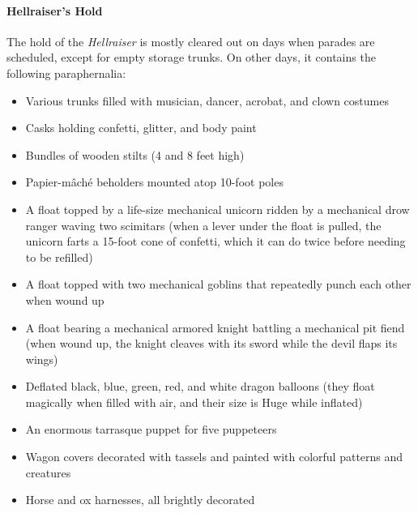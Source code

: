 \documentclass[10pt,a4paper,twoside,twocolumn,openany,nodeprecatedcode]{dndbook}
\begin{document}
\paragraph{Hellraiser's Hold}
The hold of the \textit{Hellraiser} is mostly cleared out on days when parades are scheduled, except for empty storage trunks. On other days, it contains the following paraphernalia:
\begin{itemize}

\item Various trunks filled with musician, dancer, acrobat, and clown costumes
\item Casks holding confetti, glitter, and body paint
\item Bundles of wooden stilts (4 and 8 feet high)
\item Papier-mâché beholders mounted atop 10-foot poles
\item A float topped by a life-size mechanical unicorn ridden by a mechanical drow ranger waving two scimitars (when a lever under the float is pulled, the unicorn farts a 15-foot cone of confetti, which it can do twice before needing to be refilled)
\item A float topped with two mechanical goblins that repeatedly punch each other when wound up
\item A float bearing a mechanical armored knight battling a mechanical pit fiend (when wound up, the knight cleaves with its sword while the devil flaps its wings)
\item Deflated black, blue, green, red, and white dragon balloons (they float magically when filled with air, and their size is Huge while inflated)
\item An enormous tarrasque puppet for five puppeteers
\item Wagon covers decorated with tassels and painted with colorful patterns and creatures
\item Horse and ox harnesses, all brightly decorated
\end{itemize}
\end{document}
